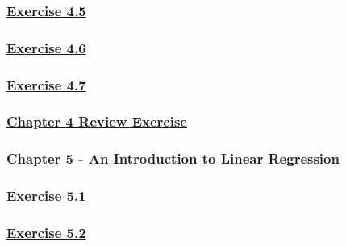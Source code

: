 \documentclass[
  11pt,
]{book}
\begin{document}
\subsubsection*{\texorpdfstring{\hyperref[ex45q]{Exercise 4.5}}{Exercise 4.5}}\label{exercise-4.5-1}

\subsubsection*{\texorpdfstring{\hyperref[ex46q]{Exercise 4.6}}{Exercise 4.6}}\label{exercise-4.6-1}

\subsubsection*{\texorpdfstring{\hyperref[ex47q]{Exercise 4.7}}{Exercise 4.7}}\label{exercise-4.7-1}

\subsubsection*{\texorpdfstring{\hyperref[re4q]{Chapter 4 Review Exercise}}{Chapter 4 Review Exercise}}\label{chapter-4-review-exercise}

\subsubsection*{Chapter 5 - An Introduction to Linear Regression}\label{chapter-5---an-introduction-to-linear-regression}

\subsubsection*{\texorpdfstring{\hyperref[ex51q]{Exercise 5.1}}{Exercise 5.1}}\label{exercise-5.1-1}

\subsubsection*{\texorpdfstring{\hyperref[ex52q]{Exercise 5.2}}{Exercise 5.2}}\label{exercise-5.2-1}
\end{document}

